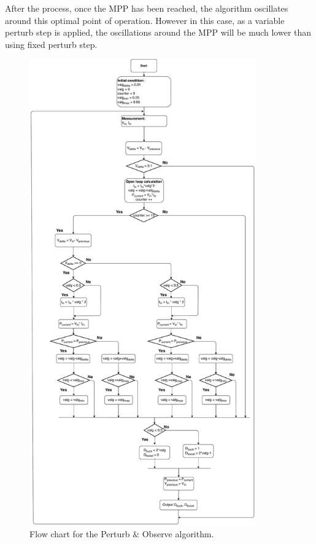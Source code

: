 After the process, once the MPP has been reached, the algorithm oscillates around this optimal point of operation. However in this case, as a variable perturb step is applied, the oscillations around the MPP will be much lower than using fixed perturb step.  



\begin{figure}[H]
	\begin{center}
		\includegraphics[width=0.87\textwidth]{../Pictures/P1/Flow_chart/2018_11_29_Flow_chart_MPPT_Buck_Bosst_converter.pdf}
		\caption{Flow chart for the Perturb \& Observe algorithm.}
		\label{fcfinal} 
	\end{center}	
\end{figure}

